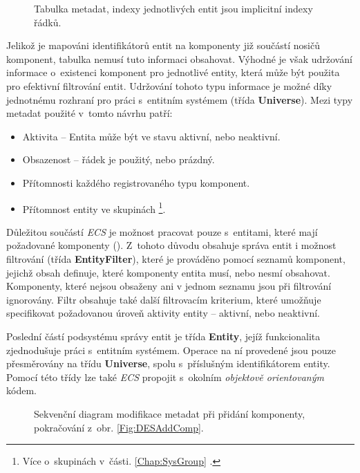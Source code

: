 \begin{figure}[H]
	\centering
	\caption{Tabulka metadat, indexy jednotlivých entit jsou implicitní indexy řádků.}
	\label{Fig:DESMetadata}
\end{figure}

Jelikož je mapováni identifikátorů entit na komponenty již součástí nosičů komponent, tabulka nemusí tuto informaci obsahovat. Výhodné je však udržování informace o~existenci komponent pro jednotlivé entity, která může být použita pro efektivní filtrování entit. Udržování tohoto typu informace je možné díky jednotnému rozhraní pro práci s~entitním systémem (třída \textbf{Universe}). Mezi typy metadat použité v~tomto návrhu patří: 
\begin{itemize}
	\item Aktivita -- Entita může být ve stavu aktivní, nebo neaktivní.
	\item Obsazenost -- řádek je použitý, nebo prázdný. 
	\item Přítomnosti každého registrovaného typu komponent.
	\item Přítomnost entity ve skupinách \footnote{Více o~skupinách v~části. \ref{Chap:SysGroup} .}.
\end{itemize}

Důležitou součástí \emph{ECS} je možnost pracovat pouze s~entitami, které mají požadované komponenty (). Z~tohoto důvodu obsahuje správa entit i možnost filtrování (třída \textbf{EntityFilter}), které je prováděno pomocí seznamů komponent, jejichž obsah definuje, které komponenty entita musí, nebo nesmí obsahovat. Komponenty, které nejsou obsaženy ani v jednom seznamu jsou při filtrování ignorovány. Filtr obsahuje také další filtrovacím kriterium, které umožňuje specifikovat požadovanou úroveň aktivity entity -- aktivní, nebo neaktivní.

Poslední částí podsystému správy entit je třída \textbf{Entity}, jejíž funkcionalita zjednodušuje práci s~entitním systémem. Operace na ní provedené jsou pouze přesměrovány na třídu \textbf{Universe}, spolu s~příslušným identifikátorem entity. Pomocí této třídy lze také \emph{ECS} propojit s~okolním \emph{objektově orientovaným} kódem.

\begin{figure}[H]
	\centering
	\caption{Sekvenční diagram modifikace metadat při přidání komponenty, pokračování z~obr. \ref{Fig:DESAddComp}.}
	\label{Fig:DESAddEnt}
\end{figure}

